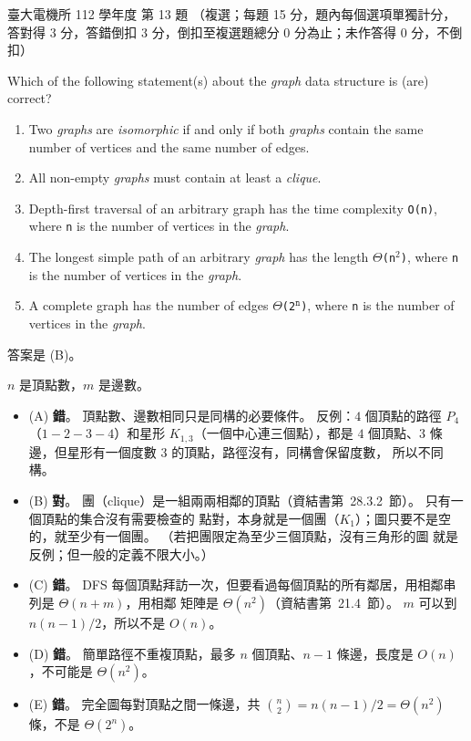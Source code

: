 \begin{pastexam}[label={px:ntu-112-ee-ds-13}]{臺大電機所 112 學年度 第 13 題}
（複選；每題 15 分，題內每個選項單獨計分，答對得 3 分，答錯倒扣 3 分，倒扣至複選題總分 0 分為止；未作答得 0 分，不倒扣）

Which of the following statement(s) about the \textit{graph} data structure is (are) correct?
\begin{enumerate}[label=(\Alph*)]
\item Two \textit{graphs} are \textit{isomorphic} if and only if both \textit{graphs} contain the same number of vertices and the same number of edges.
\item All non-empty \textit{graphs} must contain at least a \textit{clique}.
\item Depth-first traversal of an arbitrary graph has the time complexity \texttt{O(n)}, where \texttt{n} is the number of vertices in the \textit{graph}.
\item The longest simple path of an arbitrary \textit{graph} has the length \texttt{$\Theta$(n$^2$)}, where \texttt{n} is the number of vertices in the \textit{graph}.
\item A complete graph has the number of edges \texttt{$\Theta$(2$^{\texttt{n}}$)}, where \texttt{n} is the number of vertices in the \textit{graph}.
\end{enumerate}
\end{pastexam}

\begin{pastsoln}
答案是 (B)。

$n$ 是頂點數，$m$ 是邊數。
\begin{itemize}
\item (A) \textbf{錯}。 頂點數、邊數相同只是同構的必要條件。 反例：$4$ 個頂點的路徑 $P_4$（$1-2-3-4$）和星形
$K_{1,3}$（一個中心連三個點），都是 $4$ 個頂點、$3$ 條邊，但星形有一個度數 $3$ 的頂點，路徑沒有，同構會保留度數，
所以不同構。
\item (B) \textbf{對}。 團（clique）是一組兩兩相鄰的頂點（資結書第~28.3.2~節）。 只有一個頂點的集合沒有需要檢查的
點對，本身就是一個團（$K_1$）；圖只要不是空的，就至少有一個團。 （若把團限定為至少三個頂點，沒有三角形的圖
就是反例；但一般的定義不限大小。）
\item (C) \textbf{錯}。 DFS 每個頂點拜訪一次，但要看過每個頂點的所有鄰居，用相鄰串列是 $\Theta(n + m)$，用相鄰
矩陣是 $\Theta(n^2)$（資結書第~21.4~節）。 $m$ 可以到 $n(n-1)/2$，所以不是 $O(n)$。
\item (D) \textbf{錯}。 簡單路徑不重複頂點，最多 $n$ 個頂點、$n - 1$ 條邊，長度是 $O(n)$，不可能是 $\Theta(n^2)$。
\item (E) \textbf{錯}。 完全圖每對頂點之間一條邊，共 $\binom{n}{2} = n(n-1)/2 = \Theta(n^2)$ 條，不是 $\Theta(2^n)$。
\end{itemize}
\end{pastsoln}
